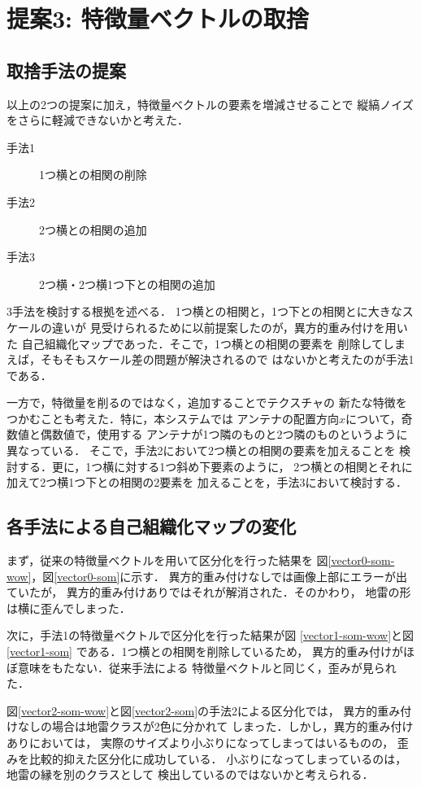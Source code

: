 ﻿\documentclass[12pt,oneside]{jsbook}
\begin{document}
\newpage
\chapter{提案3: 特徴量ベクトルの取捨}
\section{取捨手法の提案}
以上の2つの提案に加え，特徴量ベクトルの要素を増減させることで
縦縞ノイズをさらに軽減できないかと考えた．
\begin{description}
\item[手法1] 1つ横との相関の削除
\item[手法2] 2つ横との相関の追加
\item[手法3] 2つ横・2つ横1つ下との相関の追加
\end{description}
3手法を検討する根拠を述べる．
1つ横との相関と，1つ下との相関とに大きなスケールの違いが
見受けられるために以前提案したのが，異方的重み付けを用いた
自己組織化マップであった．そこで，1つ横との相関の要素を
削除してしまえば，そもそもスケール差の問題が解決されるので
はないかと考えたのが手法1である．

一方で，特徴量を削るのではなく，追加することでテクスチャの
新たな特徴をつかむことも考えた．特に，本システムでは
アンテナの配置方向$x$について，奇数値と偶数値で，使用する
アンテナが1つ隣のものと2つ隣のものというように異なっている．
そこで，手法2において2つ横との相関の要素を加えることを
検討する．更に，1つ横に対する1つ斜め下要素のように，
2つ横との相関とそれに加えて2つ横1つ下との相関の2要素を
加えることを，手法3において検討する．
\section{各手法による自己組織化マップの変化}
まず，従来の特徴量ベクトルを用いて区分化を行った結果を
図\ref{vector0-som-wow}，図\ref{vector0-som}に示す．
異方的重み付けなしでは画像上部にエラーが出ていたが，
異方的重み付けありではそれが解消された．そのかわり，
地雷の形は横に歪んでしまった．

次に，手法1の特徴量ベクトルで区分化を行った結果が図
\ref{vector1-som-wow}と図\ref{vector1-som}
である．1つ横との相関を削除しているため，
異方的重み付けがほぼ意味をもたない．従来手法による
特徴量ベクトルと同じく，歪みが見られた．

図\ref{vector2-som-wow}と図\ref{vector2-som}の手法2による区分化では，
異方的重み付けなしの場合は地雷クラスが2色に分かれて
しまった．しかし，異方的重み付けありにおいては，
実際のサイズより小ぶりになってしまってはいるものの，
歪みを比較的抑えた区分化に成功している．
小ぶりになってしまっているのは，地雷の縁を別のクラスとして
検出しているのではないかと考えられる．
\end{document}
